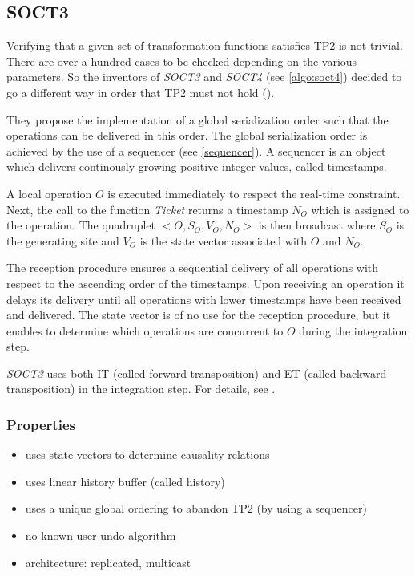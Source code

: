 \subsection{SOCT3}
\label{algo:soct3}

Verifying that a given set of transformation functions satisfies TP2 is not trivial. There are over a hundred cases to be checked depending on the various parameters. So the inventors of \emph{SOCT3} and \emph{SOCT4} (see \ref{algo:soct4}) decided to go a different way in order that  TP2 must not hold (\cite{suleiman00}).

They propose the implementation of a global serialization order such that the operations can be delivered in this order. The global serialization order is achieved by the use of a sequencer (see \ref{sequencer}). A sequencer is an object which delivers continously growing positive integer values, called timestamps.

A local operation $O$ is executed immediately to respect the real-time constraint. Next, the call to the function \emph{Ticket} returns a timestamp $N_{O}$ which is assigned to the operation. The quadruplet $<O,S_{O},V_{O},N_{O}>$ is then broadcast where $S_{O}$ is the generating site and $V_{O}$ is the state vector associated with $O$ and $N_{O}$.

The reception procedure ensures a sequential delivery of all operations with respect to the ascending order of the timestamps. Upon receiving an operation it delays its delivery until all operations with lower timestamps have been received and delivered. The state vector is of no use for the reception procedure, but it enables to determine which operations are concurrent to $O$ during the integration step.

\emph{SOCT3} uses both IT (called forward transposition) and ET (called backward transposition) in the integration step. For details, see \cite{suleiman00}.


\subsubsection{Properties}
\begin{itemize}
 \item uses state vectors to determine causality relations
 \item uses linear history buffer (called history)
 \item uses a unique global ordering to abandon TP2 (by using a sequencer)
 \item no known user undo algorithm
 \item architecture: replicated, multicast
\end{itemize}
